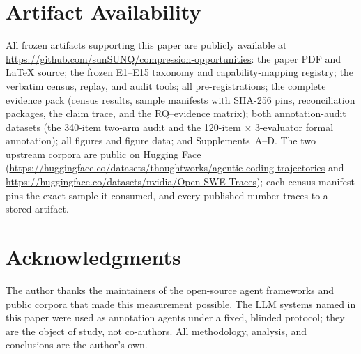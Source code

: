 ﻿\documentclass[sigconf,balance=false]{acmart}
\begin{document}
\section*{Artifact Availability}

All frozen artifacts supporting this paper are publicly available at \url{https://github.com/sunSUNQ/compression-opportunities}: the paper PDF and \LaTeX{} source; the frozen E1--E15 taxonomy and capability-mapping registry; the verbatim census, replay, and audit tools; all pre-registrations; the complete evidence pack (census results, sample manifests with SHA-256 pins, reconciliation packages, the claim trace, and the RQ--evidence matrix); both annotation-audit datasets (the 340-item two-arm audit and the 120-item $\times$ 3-evaluator formal annotation); all figures and figure data; and Supplements~A--D. The two upstream corpora are public on Hugging Face (\url{https://huggingface.co/datasets/thoughtworks/agentic-coding-trajectories} and \url{https://huggingface.co/datasets/nvidia/Open-SWE-Traces}); each census manifest pins the exact sample it consumed, and every published number traces to a stored artifact.


\nocite{costattribution2026,iclr_compression2026,acm_acm2026,difficulty2026,contextrot2026,hasmem2026,trace2026,summariesdistort2026}
%
\section*{Acknowledgments}
The author thanks the maintainers of the open-source agent frameworks and public corpora that made this measurement possible. The LLM systems named in this paper were used as annotation agents under a fixed, blinded protocol; they are the object of study, not co-authors. All methodology, analysis, and conclusions are the author's own.


\def\bibfont{\footnotesize}
\setlength{\bibsep}{2.5pt}

\vfill
\end{document}
